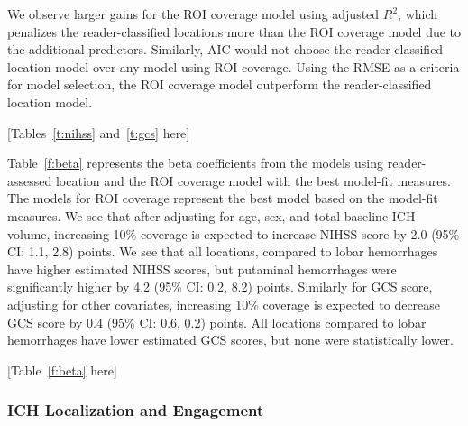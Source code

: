 \documentclass[10pt]{article}\usepackage[]{graphicx}\usepackage[]{color}
\begin{document}
We observe larger gains for the ROI coverage model using adjusted $R^2$, which penalizes the reader-classified locations more than the ROI coverage model due to the additional predictors.  Similarly, AIC would not choose the reader-classified location model over any model using ROI coverage.  Using the RMSE as a criteria for model selection, the ROI coverage model outperform the reader-classified location model.  


[Tables~\ref{t:nihss} and~\ref{t:gcs} here]


Table~\ref{f:beta} represents the beta coefficients from the models using reader-assessed location and the ROI coverage model with the best model-fit measures.  The models for ROI coverage represent the best model based on the model-fit measures. We see that after adjusting for age, sex, and total baseline ICH volume, increasing 10\% coverage is expected to increase NIHSS score by 2.0 (95\% CI: 1.1, 2.8) points.  We see that all locations, compared to lobar hemorrhages have higher estimated NIHSS scores, but putaminal hemorrhages were significantly higher by 4.2 (95\% CI: 0.2, 8.2) points. 
Similarly for GCS score, adjusting for other covariates, increasing 10\% coverage is expected to decrease GCS score by 0.4 (95\% CI: 0.6, 0.2) points.  All locations compared to lobar hemorrhages have lower estimated GCS scores, but none were statistically lower.

[Table~\ref{f:beta} here]








\subsubsection{ICH Localization and Engagement}
\end{document}
